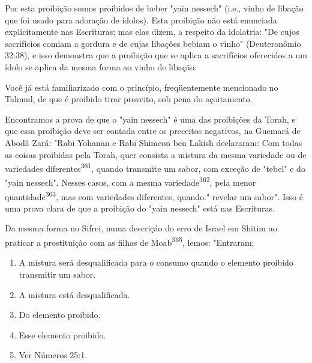\begin{itemize}
\begin{enumrate}
\begin{itemize}
\begin{itemize}
\begin{itemize}
Por esta proibição somos proibidos de beber "yain nessech" (i.e., vinho
de libação que foi usado para adoração de ídolos). Esta proibição não
está enunciada explicitamente nas Escrituras; mas elas dizem, a respeito
da ido­latria: "De cujos sacrifícios comiam a gordura e de cujas
libações bebiam o vi­nho" (Deuteronômio 32:38), e isso demonstra que a
proibição que se aplica a sacrifícios oferecidos a um ídolo se aplica da
mesma forma ao vinho de libação.

Você já está familiarizado com o princípio, freqüentemente mencio­nado
no Talmud, de que é proibido tirar proveito, sob pena do açoitamento.

Encontramos a prova de que o "yain nessech" é uma das proibições da
Torah, e que essa proibição deve ser contada entre os preceitos
negativos, na Guemará de Abodá Zará: "Rabi Yohanan e Rabi Shimeon ben
Lakish decla­raram: Com todas as coisas proibidas pela Torah, quer
consista a mistura da mesma variedade ou de variedades
diferentes\textsuperscript{361}, quando transmite um sabor, com exceção
de "tebel" e do "yain nessech". Nesses casos, com a mesma
variedade\textsuperscript{362}, pela menor
quantidade\textsuperscript{363}, mas com variedades diferentes,
quan­do." revelar um sabor". Isso é uma prova clara de
que a proibição do "yain nessech" está nas Escrituras.

Da mesma forma no Sifrei, numa descriçáo do erro de Israel em Shitim
ao. praticar a prostituição com as filhas de
Moab\textsuperscript{365}, lemos: "Entraram;


\begin{enumerate}
\def\labelenumi{\arabic{enumi}.}
\setcounter{enumi}{360}
\item
 
 A mistura será desqualificada para o consumo quando o elemento
 proibido transmitir um sabor.
 
\item
 
 A mistura está desqualificada.
 
\item
 
 Do elemento proibido.
 
\item
 
 Esse elemento proibido.
 
\item
 
 Ver Números 25:1.
 
\end{enumerate}


\end{itemize}
\end{itemize}
\end{itemize}
\end{enumrate}
\end{itemize}
